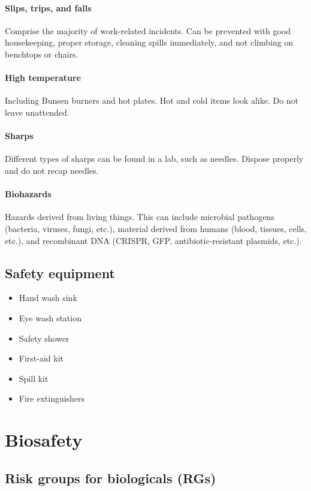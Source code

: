 \documentclass[letterpaper, 12pt]{article}
\begin{document}
\paragraph{Slips, trips, and falls} Comprise the majority of work-related incidents. Can be prevented with good housekeeping, proper storage, cleaning spills immediately, and not climbing on benchtops or chairs.

\paragraph{High temperature} Including Bunsen burners and hot plates. Hot and cold items look alike. Do not leave unattended.

\paragraph{Sharps} Different types of sharps can be found in a lab, such as needles. Dispose properly and do not recap needles.

\paragraph{Biohazards} Hazards derived from living things. This can include microbial pathogens (bacteria, viruses, fungi, etc.), material derived from humans (blood, tissues, cells, etc.), and recombinant DNA (CRISPR, GFP, antibiotic-resistant plasmids, etc.).

\subsection*{Safety equipment}
\begin{itemize}
\item Hand wash sink
\item Eye wash station
\item Safety shower
\item First-aid kit
\item Spill kit
\item Fire extinguishers
\end{itemize}

\section*{Biosafety}

\subsection*{Risk groups for biologicals (RGs)}
\end{document}
